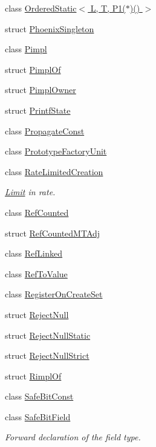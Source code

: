 \begin{DoxyCompactItemize}
\item 
class \hyperlink{classLoki_1_1OrderedStatic_3_01L_00_01T_00_01P1_07_5_08_07_08_01_4}{Ordered\+Static$<$ L, T, P1($\ast$)() $>$}
\item 
struct \hyperlink{classLoki_1_1PhoenixSingleton}{Phoenix\+Singleton}
\item 
class \hyperlink{classLoki_1_1Pimpl}{Pimpl}
\item 
struct \hyperlink{structLoki_1_1PimplOf}{Pimpl\+Of}
\item 
struct \hyperlink{structLoki_1_1PimplOwner}{Pimpl\+Owner}
\item 
struct \hyperlink{structLoki_1_1PrintfState}{Printf\+State}
\item 
class \hyperlink{structLoki_1_1PropagateConst}{Propagate\+Const}
\item 
class \hyperlink{classLoki_1_1PrototypeFactoryUnit}{Prototype\+Factory\+Unit}
\item 
class \hyperlink{classLoki_1_1RateLimitedCreation}{Rate\+Limited\+Creation}
\begin{DoxyCompactList}\small\item\em \hyperlink{classLimit}{Limit} in rate. \end{DoxyCompactList}\item 
class \hyperlink{classLoki_1_1RefCounted}{Ref\+Counted}
\item 
struct \hyperlink{structLoki_1_1RefCountedMTAdj}{Ref\+Counted\+M\+T\+Adj}
\item 
class \hyperlink{classLoki_1_1RefLinked}{Ref\+Linked}
\item 
class \hyperlink{classLoki_1_1RefToValue}{Ref\+To\+Value}
\item 
class \hyperlink{structLoki_1_1RegisterOnCreateSet}{Register\+On\+Create\+Set}
\item 
struct \hyperlink{structLoki_1_1RejectNull}{Reject\+Null}
\item 
struct \hyperlink{structLoki_1_1RejectNullStatic}{Reject\+Null\+Static}
\item 
struct \hyperlink{structLoki_1_1RejectNullStrict}{Reject\+Null\+Strict}
\item 
struct \hyperlink{structLoki_1_1RimplOf}{Rimpl\+Of}
\item 
class \hyperlink{classLoki_1_1SafeBitConst}{Safe\+Bit\+Const}
\item 
class \hyperlink{classLoki_1_1SafeBitField}{Safe\+Bit\+Field}
\begin{DoxyCompactList}\small\item\em Forward declaration of the field type. \end{DoxyCompactList}\item 

\end{DoxyCompactItemize}
